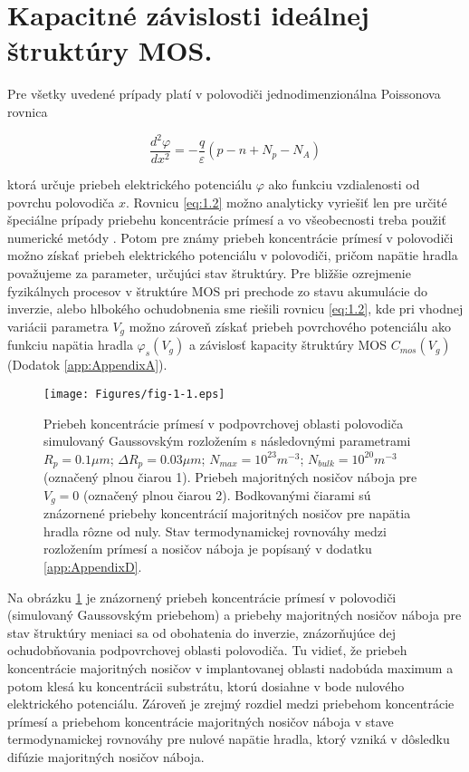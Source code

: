 \section{Kapacitné závislosti ideálnej štruktúry MOS.}

Pre všetky uvedené prípady platí v polovodiči jednodimenzionálna
Poissonova rovnica

\begin{equation}\label{eq:1.2}
\frac{d^2\varphi}{dx^2}=-\frac{q}{\varepsilon}(p-n+N_{p}-N_{A})
\end{equation}

ktorá určuje priebeh elektrického potenciálu $\varphi$ ako funkciu
vzdialenosti od povrchu polovodiča $x$. Rovnicu \ref{eq:1.2} možno
analyticky vyriešiť len pre určité špeciálne prípady priebehu
koncentrácie prímesí a vo všeobecnosti treba použiť numerické metódy
\cite{1.9,1.10}. Potom pre známy priebeh koncentrácie prímesí v
polovodiči možno získať priebeh elektrického potenciálu v polovodiči,
pričom napätie hradla považujeme za parameter, určujúci stav
štruktúry. Pre bližšie ozrejmenie fyzikálnych procesov v štruktúre MOS
pri prechode zo stavu akumulácie do inverzie, alebo hlbokého
ochudobnenia sme riešili rovnicu \ref{eq:1.2}, kde pri vhodnej
variácii parametra $V_g$ možno zároveň získať priebeh povrchového
potenciálu ako funkciu napätia hradla $\varphi_{s}(V_g)$ a závislosť
kapacity štruktúry MOS $C_{mos}(V_g)$ (Dodatok \ref{app:AppendixA}).

\begin{figure}[h!]\centering
\texttt{[image: Figures/fig-1-1.eps]}
\captionsetup{justification=raggedright, singlelinecheck=false}
\caption[Priebeh koncentrácie prímesí v podpovrchovej oblasti
  polovodiča]{Priebeh koncentrácie prímesí v podpovrchovej oblasti
  polovodiča simulovaný Gaussovským rozložením \cite{1.11} s
  následovnými parametrami $R_p=0.1 \mu{m}$; $\Delta{R_p}=0.03
  \mu{m}$; $N_{max}=10^{23} m^{-3}$; $N_{bulk}=10^{20} m^{-3}$
  (označený plnou čiarou 1). Priebeh majoritných nosičov náboja pre
  $V_g=0$ (označený plnou čiarou 2). Bodkovanými čiarami sú znázornené
  priebehy koncentrácií majoritných nosičov pre napätia hradla rôzne
  od nuly. Stav termodynamickej rovnováhy medzi rozložením prímesí a
  nosičov náboja je popísaný v dodatku \ref{app:AppendixD}.}
\label{fig:1.1}
\end{figure}

\par Na obrázku \ref{fig:1.1} je znázornený priebeh koncentrácie
prímesí v polovodiči (simulovaný Gaussovským priebehom) a priebehy
majoritných nosičov náboja pre stav štruktúry meniaci sa od obohatenia
do inverzie, znázorňujúce dej ochudobňovania podpovrchovej oblasti
polovodiča. Tu vidieť, že priebeh koncentrácie majoritných nosičov v
implantovanej oblasti nadobúda maximum a potom klesá ku koncentrácii
substrátu, ktorú dosiahne v bode nulového elektrického potenciálu.
Zároveň je zrejmý rozdiel medzi priebehom koncentrácie prímesí a
priebehom koncentrácie majoritných nosičov náboja v stave
termodynamickej rovnováhy pre nulové napätie hradla, ktorý vzniká v
dôsledku difúzie majoritných nosičov náboja.

